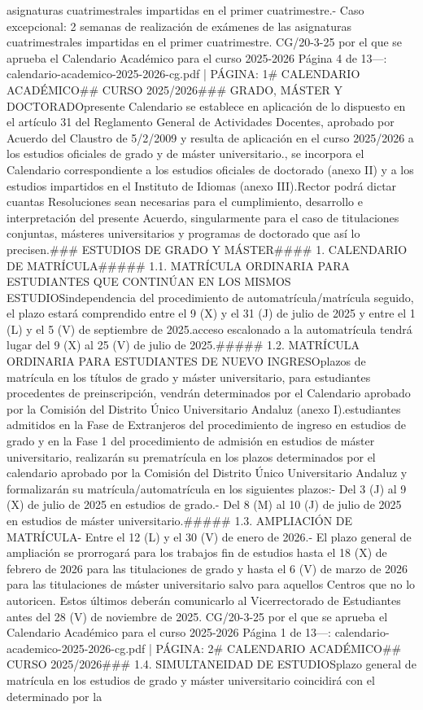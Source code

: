 \documentclass{article}
\begin{document}
\begin{itemize}
asignaturas cuatrimestrales impartidas en el primer cuatrimestre.\n- Caso excepcional: 2 semanas de realización de exámenes de las asignaturas cuatrimestrales impartidas en el primer cuatrimestre.\n{} CG/20-3-25 por el que se aprueba el Calendario Académico para el curso 2025-2026  Página 4 de 13\n\n---\n\nFUENTE: calendario-academico-2025-2026-cg.pdf | PÁGINA: 1\n# CALENDARIO ACADÉMICO\n## CURSO 2025/2026\n\n### GRADO, MÁSTER Y DOCTORADO\n\nEl presente Calendario se establece en aplicación de lo dispuesto en el artículo 31 del Reglamento General de Actividades Docentes, aprobado por Acuerdo del Claustro de 5/2/2009 y resulta de aplicación en el curso 2025/2026 a los estudios oficiales de grado y de máster universitario.\n\nAsimismo, se incorpora el Calendario correspondiente a los estudios oficiales de doctorado (anexo II) y a los estudios impartidos en el Instituto de Idiomas (anexo III).\n\nEl Rector podrá dictar cuantas Resoluciones sean necesarias para el cumplimiento, desarrollo e interpretación del presente Acuerdo, singularmente para el caso de titulaciones conjuntas, másteres universitarios y programas de doctorado que así lo precisen.\n\n### ESTUDIOS DE GRADO Y MÁSTER\n\n#### 1. CALENDARIO DE MATRÍCULA\n\n##### 1.1. MATRÍCULA ORDINARIA PARA ESTUDIANTES QUE CONTINÚAN EN LOS MISMOS ESTUDIOS\n\nCon independencia del procedimiento de automatrícula/matrícula seguido, el plazo estará comprendido entre el 9 (X) y el 31 (J) de julio de 2025 y entre el 1 (L) y el 5 (V) de septiembre de 2025.\n\nEl acceso escalonado a la automatrícula tendrá lugar del 9 (X) al 25 (V) de julio de 2025.\n\n##### 1.2. MATRÍCULA ORDINARIA PARA ESTUDIANTES DE NUEVO INGRESO\n\nLos plazos de matrícula en los títulos de grado y máster universitario, para estudiantes procedentes de preinscripción, vendrán determinados por el Calendario aprobado por la Comisión del Distrito Único Universitario Andaluz (anexo I).\n\nLos estudiantes admitidos en la Fase de Extranjeros del procedimiento de ingreso en estudios de grado y en la Fase 1 del procedimiento de admisión en estudios de máster universitario, realizarán su prematrícula en los plazos determinados por el calendario aprobado por la Comisión del Distrito Único Universitario Andaluz y formalizarán su matrícula/automatrícula en los siguientes plazos:\n\n- Del 3 (J) al 9 (X) de julio de 2025 en estudios de grado.\n- Del 8 (M) al 10 (J) de julio de 2025 en estudios de máster universitario.\n\n##### 1.3. AMPLIACIÓN DE MATRÍCULA\n\n- Entre el 12 (L) y el 30 (V) de enero de 2026.\n- El plazo general de ampliación se prorrogará para los trabajos fin de estudios hasta el 18 (X) de febrero de 2026 para las titulaciones de grado y hasta el 6 (V) de marzo de 2026 para las titulaciones de máster universitario salvo para aquellos Centros que no lo autoricen. Estos últimos deberán comunicarlo al Vicerrectorado de Estudiantes antes del 28 (V) de noviembre de 2025.\n{} CG/20-3-25 por el que se aprueba el Calendario Académico para el curso 2025-2026  Página 1 de 13\n\n---\n\nFUENTE: calendario-academico-2025-2026-cg.pdf | PÁGINA: 2\n# CALENDARIO ACADÉMICO\n## CURSO 2025/2026\n\n### 1.4. SIMULTANEIDAD DE ESTUDIOS\n\nEl plazo general de matrícula en los estudios de grado y máster universitario coincidirá con el determinado por la 
\end{itemize}
\end{document}

